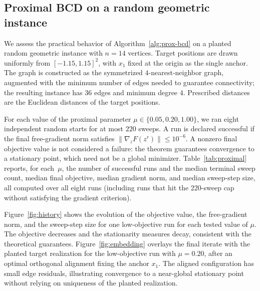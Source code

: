 \documentclass[11pt]{article}
\begin{document}
\begin{table}[ht]
\centering

\caption{One proximal sweep (\(\mu=0.20\)) starting at each point of the unregularized two-cycle.  The iterate is unchanged, confirming that both cycle points are fixed points of the proximal method.}
\label{tab:proximal-cycle}
\end{table}

\subsection{Proximal BCD on a random geometric instance}
\label{subsec:random}

We assess the practical behavior of Algorithm~\ref{alg:prox-bcd} on a planted random geometric instance with \(n=14\) vertices.  Target positions are drawn uniformly from \([-1.15,1.15]^2\), with \(x_1\) fixed at the origin as the single anchor.  The graph is constructed as the symmetrized \(4\)-nearest-neighbor graph, augmented with the minimum number of edges needed to guarantee connectivity; the resulting instance has \(36\) edges and minimum degree \(4\).  Prescribed distances are the Euclidean distances of the target positions.

For each value of the proximal parameter \(\mu\in\{0.05,0.20,1.00\}\), we ran eight independent random starts for at most \(220\) sweeps.  A run is declared successful if the final free-gradient norm satisfies \(\|\nabla_z F(z^r)\|\le10^{-6}\).  A nonzero final objective value is not considered a failure: the theorem guarantees convergence to a stationary point, which need not be a global minimizer.  Table~\ref{tab:proximal} reports, for each~$\mu$, the number of successful runs and the median terminal sweep count, median final objective, median gradient norm, and median sweep-step size, all computed over all eight runs (including runs that hit the 220-sweep cap without satisfying the gradient criterion).

\begin{table}[ht]
\centering

\caption{Summary of eight random starts for each proximal parameter on the random geometric instance (\(n=14\), \(36\) edges).  A run is successful if \(\|\nabla_z F\|\le10^{-6}\) within \(220\) sweeps.}
\label{tab:proximal}
\end{table}

Figure~\ref{fig:history} shows the evolution of the objective value, the free-gradient norm, and the sweep-step size for one low-objective run for each tested value of \(\mu\).  The objective decreases and the stationarity measures decay, consistent with the theoretical guarantees.  Figure~\ref{fig:embedding} overlays the final iterate with the planted target realization for the low-objective run with \(\mu=0.20\), after an optimal orthogonal alignment fixing the anchor \(x_1\).  The aligned configuration has small edge residuals, illustrating convergence to a near-global stationary point without relying on uniqueness of the planted realization.
\end{document}
